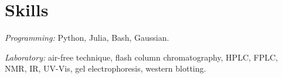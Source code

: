 \documentclass[11pt]{article}
\begin{document}
\section{Skills}
\textit{Programming:} Python, Julia, Bash, Gaussian.\par\vspace{0.4em}
\textit{Laboratory:} air-free technique, flash column chromatography, HPLC, FPLC, NMR, IR, UV-Vis, gel electrophoresis, western blotting.
\end{document}
